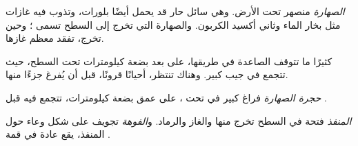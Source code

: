 \begin{definition}[الصهارة]\label{def:g7:volcanoes:magma}
\emph{الصهارة}  منصهر تحت الأرض. وهي سائل حار
قد يحمل أيضًا بلورات، وتذوب فيه غازات مثل بخار
الماء وثاني أكسيد الكربون. والصهارة التي تخرج إلى السطح تسمى
؛ وحين تخرج، تفقد معظم غازها.
\end{definition}

كثيرًا ما تتوقف  الصاعدة في طريقها، على بعد بضعة كيلومترات تحت السطح،
حيث تتجمع في جيب كبير. وهناك تنتظر، أحيانًا
قرونًا، قبل أن يُفرغ  جزءًا منها.

\begin{definition}\label{def:g7:volcanoes:magma-chamber}
\emph{حجرة الصهارة} فراغ كبير في 
تحت ، على عمق بضعة كيلومترات، تتجمع فيه  قبل
.
\end{definition}

\begin{definition}\label{def:g7:volcanoes:vent}
\emph{المنفذ} فتحة في السطح تخرج منها 
والغاز والرماد. و\emph{الفوهة} تجويف على شكل
وعاء حول المنفذ، يقع عادة في قمة .
\end{definition}

